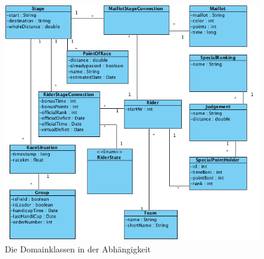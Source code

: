 \begin{figure}[h!]
\caption{Die Domainklassen in der Abhängigkeit}
\label{fig:domain}
\centering
\includegraphics[scale=0.8]{05bericht/images/domain.png}
\end{figure} 


